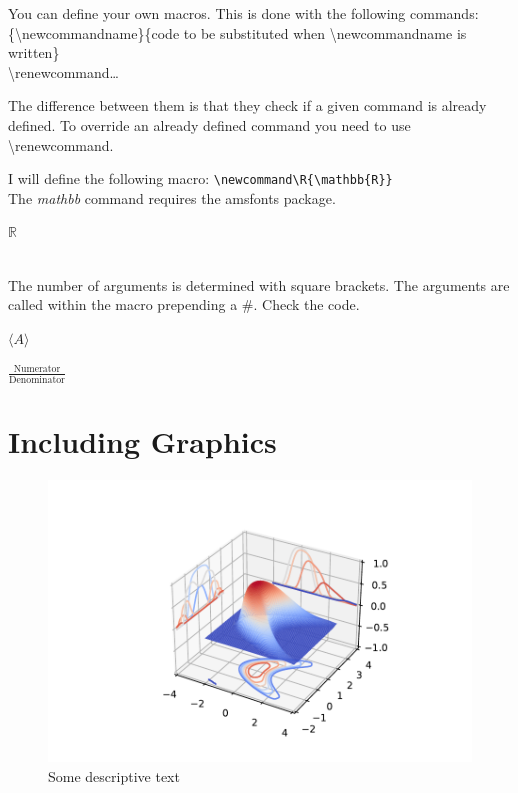 \documentclass[a4paper]{article}
\newcommand{\bs}[1]{{\color{blue}\textbackslash{}#1}}
\begin{document}
You can define your own macros. This is done with the following commands:\\

\noindent\bs{newcommand}\{\bs{newcommandname}\}\{code to be substituted when \bs{newcommandname} is written\}\\
\bs{renewcommand}\dots

The difference between them is that they check if a given command is already defined. To override an already defined command you need to use \bs{renewcommand}.

\noindent I will define the following macro:
\noindent \verb!\newcommand\R{\mathbb{R}}!\\

\noindent The \emph{mathbb} command requires the amsfonts package.\\
 
\newcommand\R{\mathbb{R}} %


$\R$

\\

The number of arguments is determined with square brackets. The arguments are called within the macro prepending a \#. Check the code.

\newcommand\average[1]{\langle#1\rangle}

$\average{A}$\\

\newcommand\fraction[2]{\frac{#1}{#2}}

$\fraction{\text{Numerator}}{\text{Denominator}}$\\


\section{Including Graphics}

\begin{figure}[h]
  \includegraphics{3dplot.pdf}
  \caption{Some descriptive text}\label{referencefigure}
\end{figure}
\end{document}
